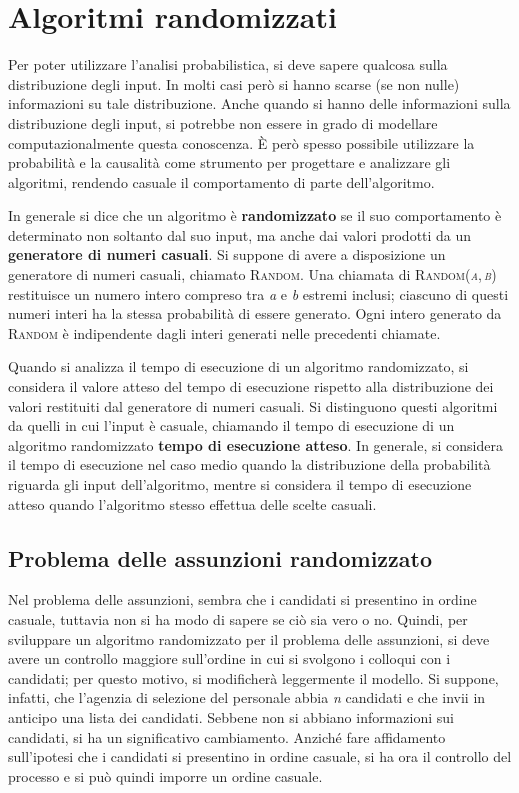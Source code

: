 \documentclass[10pt, a4paper]{report}
\begin{document}
\section{Algoritmi randomizzati}
Per poter utilizzare l'analisi probabilistica, si deve sapere qualcosa sulla distribuzione degli input. In molti casi però si hanno scarse (se non nulle) informazioni su tale distribuzione. Anche quando si hanno delle informazioni  sulla distribuzione degli input, si potrebbe non essere in grado di modellare computazionalmente questa conoscenza. È però spesso possibile utilizzare la probabilità e la causalità come strumento per progettare e analizzare gli algoritmi, rendendo casuale il comportamento di parte dell'algoritmo.

In generale si dice che un algoritmo è \textbf{randomizzato} se il suo comportamento è determinato non soltanto dal suo input, ma anche dai valori prodotti da un \textbf{generatore di numeri casuali}. Si suppone di avere a disposizione un generatore di numeri casuali, chiamato \textsc{Random}. Una chiamata di \textsc{Random(\textit{a},\,\textit{b})} restituisce un numero intero compreso tra \textit{a} e \textit{b} estremi inclusi; ciascuno di questi numeri interi ha la stessa probabilità di essere generato. Ogni intero generato da \textsc{Random} è indipendente dagli interi generati nelle precedenti chiamate.

Quando si analizza il tempo di esecuzione di un algoritmo randomizzato, si considera il valore atteso del tempo di esecuzione rispetto alla distribuzione dei valori restituiti dal generatore di numeri casuali. Si distinguono questi algoritmi da quelli in cui l'input è casuale, chiamando il tempo di esecuzione di un algoritmo randomizzato \textbf{tempo di esecuzione atteso}. In generale, si considera il tempo di esecuzione nel caso medio quando la distribuzione della probabilità riguarda gli input dell'algoritmo, mentre si considera il tempo di esecuzione atteso quando l'algoritmo stesso effettua delle scelte casuali.
\subsection{Problema delle assunzioni randomizzato}
Nel problema delle assunzioni, sembra che i candidati si presentino in ordine casuale, tuttavia non si ha modo di sapere se ciò sia vero o no. Quindi, per sviluppare un algoritmo randomizzato per il problema delle assunzioni, si deve avere un controllo maggiore sull'ordine in cui si svolgono i colloqui con i candidati; per questo motivo, si modificherà leggermente il modello. Si suppone, infatti, che l'agenzia di selezione del personale abbia \textit{n} candidati e che invii in anticipo una lista dei candidati. Sebbene non si abbiano informazioni sui candidati, si ha un significativo cambiamento. Anziché fare affidamento sull'ipotesi che i candidati si presentino in ordine casuale, si ha ora il controllo del processo e si può quindi imporre un ordine casuale.
\end{document}
